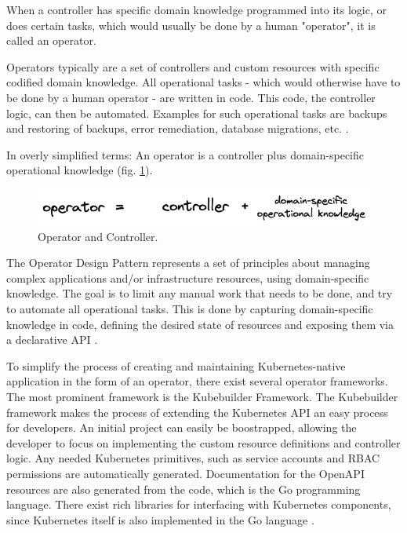 When a controller has specific domain knowledge programmed into its logic,
or does certain tasks, which would usually be done by a human "operator",
it is called an operator.

Operators typically are a set of controllers and custom resources
with specific codified domain knowledge.
All operational tasks -
which would otherwise have to be done by a human operator -
are written in code.
This code, the controller logic, can then be automated.
Examples for such operational tasks are
backups and restoring of backups, error remediation, database migrations, etc.
\autocite{operatorWhitepaperV1}.

In overly simplified terms:
An operator is a controller plus domain-specific operational knowledge
(fig. \ref{fig:operatorAndController}).

\begin{figure}[h]
	\centering
	\includegraphics[width=1.00\linewidth]{assets/operator-is-controller-domain-knowledge.png}
	\caption{Operator and Controller.
	}
	\label{fig:operatorAndController}	
\end{figure}

The Operator Design Pattern represents a set of principles about
managing complex applications and/or infrastructure resources,
using domain-specific knowledge.
The goal is to limit any manual work that needs to be done,
and try to automate all operational tasks.
This is done by capturing domain-specific knowledge in code,
defining the desired state of resources and exposing them
via a declarative API
\autocite{operatorWhitepaperV1}.

To simplify the process of creating and maintaining Kubernetes-native application
in the form of an operator,
there exist several operator frameworks.
The most prominent framework is the Kubebuilder Framework.
The Kubebuilder framework makes the process of extending the Kubernetes API
an easy process for developers.
An initial project can easily be boostrapped, allowing the developer to focus
on implementing the custom resource definitions and controller logic.
Any needed Kubernetes primitives, such as service accounts and RBAC permissions
are automatically generated.
Documentation for the OpenAPI resources are also generated from the code,
which is the Go programming language.
There exist rich libraries for interfacing with Kubernetes components,
since Kubernetes itself is also implemented in the Go language
\autocite{kubebuilderBookWebsite}.



